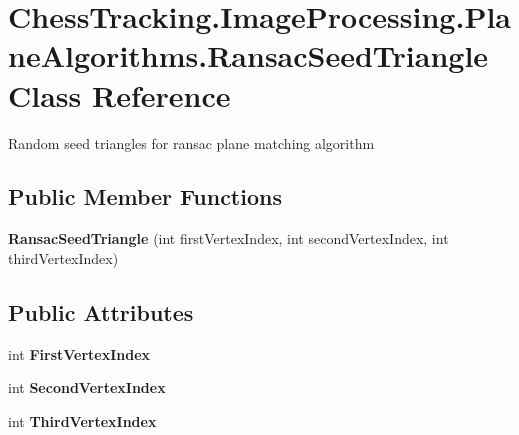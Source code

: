 \hypertarget{class_chess_tracking_1_1_image_processing_1_1_plane_algorithms_1_1_ransac_seed_triangle}{}\section{Chess\+Tracking.\+Image\+Processing.\+Plane\+Algorithms.\+Ransac\+Seed\+Triangle Class Reference}
\label{class_chess_tracking_1_1_image_processing_1_1_plane_algorithms_1_1_ransac_seed_triangle}


Random seed triangles for ransac plane matching algorithm  


\subsection*{Public Member Functions}
\begin{DoxyCompactItemize}
\item 
\mbox{\label{class_chess_tracking_1_1_image_processing_1_1_plane_algorithms_1_1_ransac_seed_triangle_a2edeb54102731f2db94c928e2aace594}} 
{\bfseries Ransac\+Seed\+Triangle} (int first\+Vertex\+Index, int second\+Vertex\+Index, int third\+Vertex\+Index)
\end{DoxyCompactItemize}
\subsection*{Public Attributes}
\begin{DoxyCompactItemize}
\item 
\mbox{\label{class_chess_tracking_1_1_image_processing_1_1_plane_algorithms_1_1_ransac_seed_triangle_a7db5b72bbd05f9cb3117d352078e1d9b}} 
int {\bfseries First\+Vertex\+Index}
\item 
\mbox{\label{class_chess_tracking_1_1_image_processing_1_1_plane_algorithms_1_1_ransac_seed_triangle_a99b08f344934abd5bcd6e6cfd81a43e8}} 
int {\bfseries Second\+Vertex\+Index}
\item 
\mbox{\label{class_chess_tracking_1_1_image_processing_1_1_plane_algorithms_1_1_ransac_seed_triangle_ae578b64c92dd51be35d8035d224e2d3d}} 
int {\bfseries Third\+Vertex\+Index}
\end{DoxyCompactItemize}


